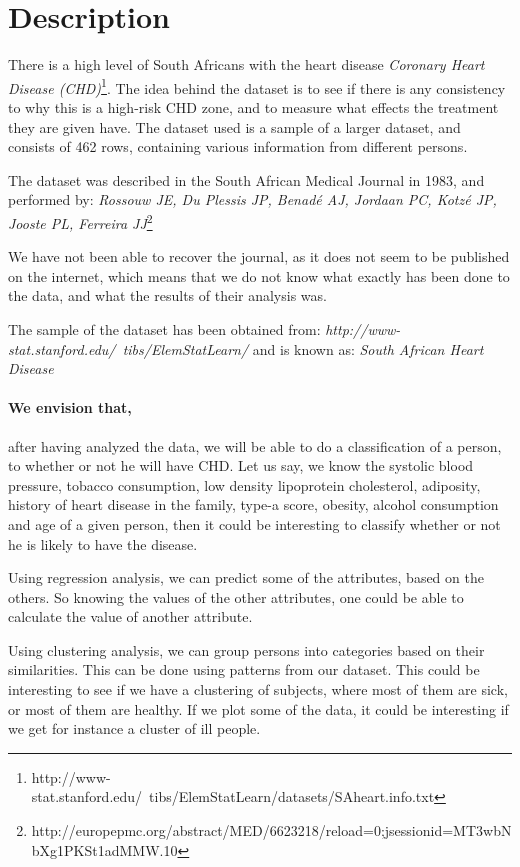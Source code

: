 \section{Description}
There is a high level of South Africans with the heart disease \textit{Coronary Heart Disease (CHD)}\footnote{http://www-stat.stanford.edu/~tibs/ElemStatLearn/datasets/SAheart.info.txt}. The idea behind the dataset is to see if there is any consistency to why this is a high-risk CHD zone, and to measure what effects the treatment they are given have. The dataset used is a sample of a larger dataset, and consists of 462 rows, containing various information from different persons.

The dataset was described in the South African Medical Journal in 1983, and performed by: \textit{Rossouw JE, Du Plessis JP, Benadé AJ, Jordaan PC, Kotzé JP, Jooste PL, Ferreira JJ}\footnote{http://europepmc.org/abstract/MED/6623218/reload=0;jsessionid=MT3wbNbXg1PKSt1adMMW.10}

We have not been able to recover the journal, as it does not seem to be published on the internet, which means that we do not know what exactly has been done to the data, and what the results of their analysis was.

The sample of the dataset has been obtained from: \textit{http://www-stat.stanford.edu/~tibs/ElemStatLearn/} and is known as: \textit{South African Heart Disease}

\paragraph{We envision that,} after having analyzed the data, we will be able to do a classification of a person, to whether or not he will have CHD. Let us say, we know the systolic blood pressure, tobacco consumption, low density lipoprotein cholesterol, adiposity, history of heart disease in the family, type-a score, obesity, alcohol consumption and age of a given person, then it could be interesting to classify whether or not he is likely to have the disease.%

Using regression analysis, we can predict some of the attributes, based on the others. So knowing the values of the other attributes, one could be able to calculate the value of another attribute.%

Using clustering analysis, we can group persons into categories based on their similarities. This can be done using patterns from our dataset. This could be interesting to see if we have a clustering of subjects, where most of them are sick, or most of them are healthy. If we plot some of the data, it could be interesting if we get for instance a cluster of ill people.

